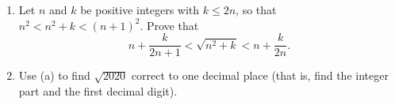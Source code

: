 \begin{enumerate}
\item[(a)] Let \(n\) and \(k\) be positive integers with \(k\le 2n\), so that \(n^2<n^2+k<(n+1)^2\). Prove that
\[
n+\dfrac{k}{2n+1}<\sqrt{n^2+k}<n+\dfrac{k}{2n}.
\]
\item[(b)] Use (a) to find \(\sqrt{2020}\) correct to one decimal place (that is, find the integer part and the first decimal digit).
\end{enumerate}
